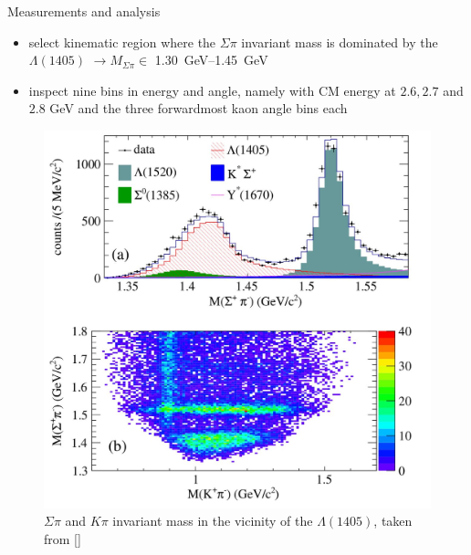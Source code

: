 \documentclass[11pt,aspectratio=1610,dvipsnames]{beamer}
\begin{document}
\begin{frame}{Measurements and analysis}
	\begin{minipage}{.4\linewidth}
			\begin{tcolorbox}[colback=black!10,colframe=gray!20!black,title=Event selection] 
			\begin{itemize}
				\item select kinematic region where the $\Sigma\pi$ invariant mass is dominated by the $\Lambda(1405)$ $\to M_{\Sigma\pi}\in$ \SIrange{1.30}{1.45}{\giga\eV}
				\item inspect nine bins in energy and angle, namely with CM energy at $2.6, 2.7$ and $2.8$ GeV and the  three forwardmost kaon angle bins each
			\end{itemize}
		\end{tcolorbox}	
\end{minipage}
\begin{minipage}{.57\linewidth}
	\begin{figure}
		\centering
		\includegraphics[width=.95\linewidth]{events_pol}
		\caption{$\Sigma\pi$  and $K\pi$ invariant mass in the vicinity of the $\Lambda(1405)$, taken from [\cite{spinparity}]}
	\end{figure}
\end{minipage}
\end{frame}
\end{document}
